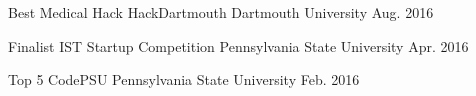 

\begin{cvhonors}

  \cvhonor
    {Best Medical Hack} %
    {HackDartmouth} %
    {Dartmouth University} %
    {Aug. 2016} %

  \cvhonor
    {Finalist} %
    {IST Startup Competition} %
    {Pennsylvania State University} %
    {Apr. 2016} %

  \cvhonor
    {Top 5} %
    {CodePSU} %
    {Pennsylvania State University} %
    {Feb. 2016} %

\end{cvhonors}


